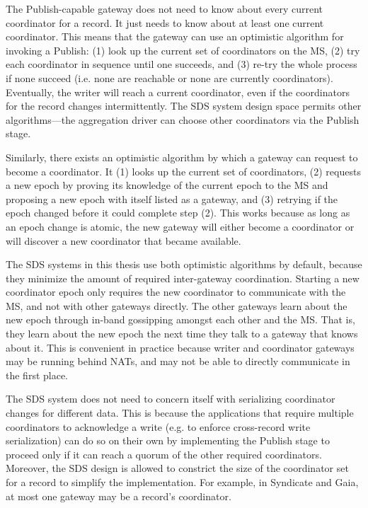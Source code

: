 The Publish-capable gateway does not need to know
about every current coordinator for a record.  It just needs to know about
at least one current coordinator.  This means that the gateway can use an
optimistic algorithm for invoking a Publish: 
(1) look up the current set of coordinators on the MS, (2) try each coordinator in
sequence until one succeeds, and (3) re-try the whole process if none
succeed (i.e. none are reachable or none are currently coordinators).
Eventually, the writer will reach a current coordinator, even if the
coordinators for the record changes intermittently.  The SDS system design space
permits other algorithms---the aggregation driver can choose other coordinators
via the Publish stage.

Similarly, there exists an optimistic algorithm by which a gateway can request
to become a coordinator.  It (1) looks up the current set of coordinators, (2)
requests a new epoch by proving its knowledge of the current epoch to the MS
and proposing a new epoch with itself listed as a gateway, and (3) retrying if the epoch
changed before it could complete step (2).  This works because as long as an epoch change
is atomic, the new gateway will either become a coordinator or will discover a
new coordinator that became available.

The SDS systems in this thesis use both optimistic algorithms by
default, because they minimize the amount of required inter-gateway coordination.
Starting a new coordinator epoch only requires the new coordinator to communicate with the MS, and not with
other gateways directly.  The other gateways learn about the new epoch through
in-band gossipping amongst each
other and the MS.  That is, they learn about the new epoch the next time they talk to
a gateway that knows about it.  This is convenient in practice because writer
and coordinator gateways may be running behind NATs, and may not be able to
directly communicate in the first place.

The SDS system does not need to concern itself with serializing coordinator
changes for different data.  This is because the applications that require
multiple coordinators to acknowledge a write (e.g. to enforce cross-record write
serialization) can do so on their own by implementing the
Publish stage to proceed only if it can reach a quorum of the other required
coordinators.  Moreover, the SDS design is allowed to constrict the size
of the coordinator set for a record to simplify the implementation.
For example, in Syndicate and Gaia, at most one gateway may be a record's coordinator.

